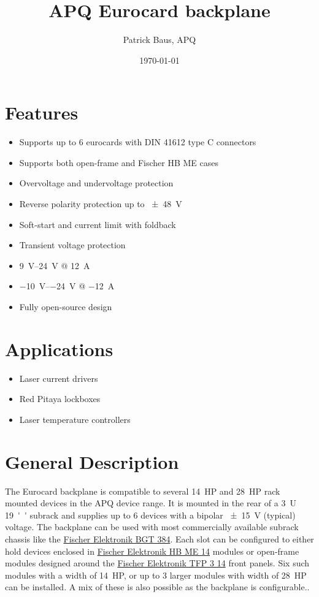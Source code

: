 \documentclass[10pt]{datasheet}
\title{APQ Eurocard backplane}
\author{Patrick Baus, APQ}
\date{\today}
\begin{document}
\maketitle

\section{Features}

\begin{itemize}
\item{Supports up to 6 eurocards with DIN 41612 type C connectors}
\item{Supports both open-frame and Fischer HB ME cases}
\item{Overvoltage and undervoltage protection}
\item{Reverse polarity protection up to \qty{\pm 48}{\V}}
\item{Soft-start and current limit with foldback}
\item{Transient voltage protection}
\item{\qtyrange{9}{24}{\V} @ \qty{12}{\A}}
\item{\qtyrange{-10}{-24}{\V} @ \qty{-12}{\A}}
\item Fully open-source design
\end{itemize}

\section{Applications}

\begin{itemize}
\item{Laser current drivers}
\item{Red Pitaya lockboxes}
\item{Laser temperature controllers}
\end{itemize}

\section{General Description}
The Eurocard backplane is compatible to several \qty{14}{HP} and \qty{28}{HP} rack mounted devices in the APQ device range. It is mounted in the rear of a \qty{3}{U} \qty{19}{''} subrack and supplies up to \num{6} devices with a bipolar \qty{\pm 15}{\V} (typical) voltage. The backplane can be used with most commercially available subrack chassis like the \href{https://www.fischerelektronik.de/web_fischer/en_GB/cases/N05.1/19%22%20subracks/$catalogue/fischerData/PR/BGT384_180/search.xhtml}{Fischer Elektronik BGT 384}.
Each slot can be configured to either hold devices enclosed in \href{https://www.fischerelektronik.com/web_fischer/en_GB/cases/N06.011/19%22%20insert%20modules/$catalogue/fischerData/PR/HBME14_/index.xhtml}{Fischer Elektronik HB ME 14}
modules or open-frame modules designed around the \href{https://www.fischerelektronik.com/web_fischer/en_GB/cases/N06.05/Part%20front%20panels/$catalogue/fischerData/PR/TFP14/index.xhtml}{Fischer Elektronik TFP 3 14}
front panels.
Six such modules with a width of \qty{14}{HP}, or up to 3 larger modules with width of \qty{28}{HP} can be installed. A mix of these is also possible as the backplane is configurable..
\end{document}
